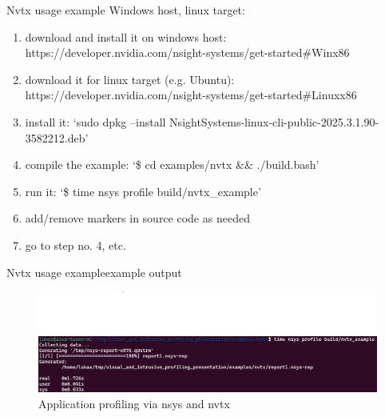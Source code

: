 \documentclass[aspectratio=169]{beamer}
\begin{document}
\begin{frame}{Nvtx usage example}
    Windows host, linux target:

    \begin{enumerate}
        \item download and install it on windows host: https://developer.nvidia.com/nsight-systems/get-started\#Winx86
        \item download it for linux target (e.g. Ubuntu): https://developer.nvidia.com/nsight-systems/get-started\#Linuxx86
        \item install it: `sudo dpkg --install NsightSystems-linux-cli-public-2025.3.1.90-3582212.deb'
        \item compile the example: `\$ cd examples/nvtx \&\& ./build.bash'
        \item run it: `\$ time nsys profile build/nvtx\_example'
        \item add/remove markers in source code as needed
        \item go to step no. 4, etc.
    \end{enumerate}

\end{frame}

\begin{frame}{Nvtx usage example}{example output}
    \begin{figure}[h]
        \centering
        \includegraphics[width=\textwidth,height=0.7\textheight,keepaspectratio]{pics/nvtx/nsys_example.png}
        \caption{Application profiling via nsys and nvtx}
    \end{figure}

\end{frame}
\end{document}
